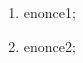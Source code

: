 \documentclass[exercice]{thedocument}%
\begin{document}
%
\begin{enumerate}
        \item \<enonce1;
        \item \<enonce2;
\end{enumerate}
\end{document}
